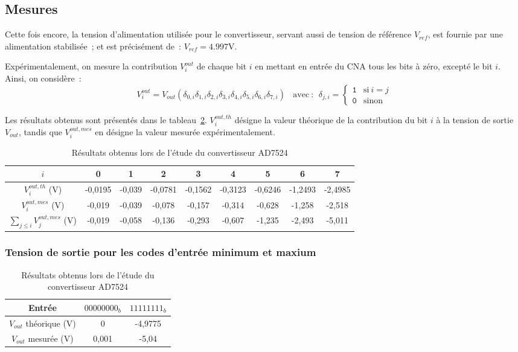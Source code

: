 \documentclass{article}
\begin{document}
\subsection{Mesures}


Cette fois encore, la tension d'alimentation utilisée pour le convertisseur, servant aussi de tension de référence $V_{ref}$, est fournie par une alimentation stabilisée~; et est précisément de~: ${V_{ref}=\mathrm{4.997 V}}$.



Expérimentalement, on mesure la contribution $V_i^{out}$ de chaque bit $i$ en mettant en entrée du CNA tous les bits à zéro, excepté le bit $i$. Ainsi, on considère~:
\begin{equation*}
V_i^{out} = V_{out}(\delta_{0,i}\delta_{1,i}\delta_{2,i}\delta_{3,i}\delta_{4,i}\delta_{5,i}\delta_{6,i}\delta_{7,i}) \mathrm{~~~~avec~:~~}\delta_{j,i} = \begin{cases} \mathtt{1} &\mathrm{si~} i=j \\ \mathtt{0} & \mbox{sinon}\end{cases}
\end{equation*}

Les résultats obtenus sont présentés dans le tableau~\ref{tab:AD7524}. $V_i^{out,th}$ désigne la valeur théorique de la contribution du bit $i$ à la tension de sortie $V_{out}$, tandis que $V_i^{out,mes}$ en désigne la valeur mesurée expérimentalement.



\begin{table}[h]
\caption{Résultats obtenus lors de l'étude du convertisseur AD7524}
\label{tab:AD7524}
\centering

\begin{tabular}{|c|c|c|c|c|c|c|c|c|}
\hline
$i$ & 0 & 1 & 2 & 3 & 4 & 5 & 6 & 7 \\
\hline
$V_i^{out,th}$ (V) & -0,0195 & -0,039 & -0,0781 & -0,1562 & -0,3123 & -0,6246 & -1,2493 & -2,4985 \\
\hline
$V_i^{out,mes}$ (V) & -0,019 & -0,039 & -0,078 & -0,157 & -0,314 & -0,628 & -1,258 & -2,518 \\
\hline
$\sum_{j\leq i}V_j^{out,mes}$ (V) & -0,019 & -0,058 & -0,136 & -0,293 & -0,607 & -1,235 & -2,493 & -5,011 \\
\hline
\end{tabular}


\subsubsection{Tension de sortie pour les codes d'entrée minimum et maxium}


\begin{tabular}{|c|c|c|}
\hline
Entrée & \texttt{$00000000_b$} & \texttt{$11111111_b$} \\
\hline
$V_{out}$ théorique (V) & 0 & -4,9775 \\
\hline
$V_{out}$ mesurée (V) & 0,001 & -5,04 \\
\hline
\end{tabular}
\end{table}
\end{document}
